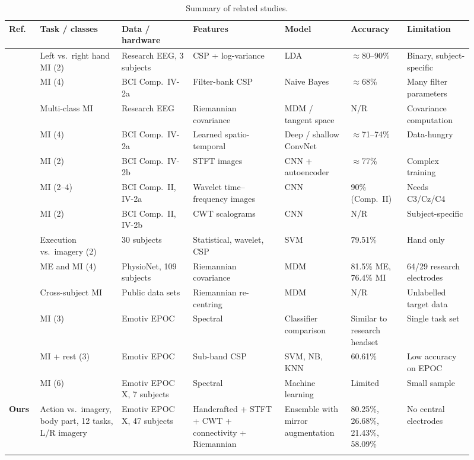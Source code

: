 \documentclass[pdflatex,sn-mathphys-num]{sn-jnl}%
\theoremstyle{thmstyleone}%
\theoremstyle{thmstyletwo}%
\theoremstyle{thmstylethree}%
\begin{document}
\begin{table}[t]
\centering
\caption{Summary of related studies.}
\label{tab:litreview}
\scriptsize
\setlength{\tabcolsep}{2.5pt}
\begin{tabular}{@{}L{0.06\linewidth}L{0.16\linewidth}L{0.14\linewidth}L{0.18\linewidth}L{0.13\linewidth}L{0.11\linewidth}L{0.13\linewidth}@{}}
\toprule
Ref. & Task / classes & Data / hardware & Features & Model & Accuracy & Limitation \\
\midrule
\cite{Ramoser2000} & Left vs.\ right hand MI (2) & Research EEG, 3 subjects & CSP + log-variance & LDA & $\approx$80--90\% & Binary, subject-specific \\
\cite{Ang2012} & MI (4) & BCI Comp.\ IV-2a & Filter-bank CSP & Naive Bayes & $\approx$68\% & Many filter parameters \\
\cite{Barachant2012} & Multi-class MI & Research EEG & Riemannian covariance & MDM / tangent space & N/R & Covariance computation \\
\cite{Schirrmeister2017} & MI (4) & BCI Comp.\ IV-2a & Learned spatio-temporal & Deep / shallow ConvNet & $\approx$71--74\% & Data-hungry \\
\cite{Tabar2017} & MI (2) & BCI Comp.\ IV-2b & STFT images & CNN + autoencoder & $\approx$77\% & Complex training \\
\cite{Xu2019} & MI (2--4) & BCI Comp.\ II, IV-2a & Wavelet time--frequency images & CNN & 90\% (Comp.\ II) & Needs C3/Cz/C4 \\
\cite{LeeChoi2019} & MI (2) & BCI Comp.\ II, IV-2b & CWT scalograms & CNN & N/R & Subject-specific \\
\cite{Wang2022} & Execution vs.\ imagery (2) & 30 subjects & Statistical, wavelet, CSP & SVM & 79.51\% & Hand only \\
\cite{Shuqfa2023} & ME and MI (4) & PhysioNet, 109 subjects & Riemannian covariance & MDM & 81.5\% ME, 76.4\% MI & 64/29 research electrodes \\
\cite{Zanini2018} & Cross-subject MI & Public data sets & Riemannian re-centring & MDM & N/R & Unlabelled target data \\
\cite{MartinezLeon2016} & MI (3) & Emotiv EPOC & Spectral & Classifier comparison & Similar to research headset & Single task set \\
\cite{Khan2019} & MI + rest (3) & Emotiv EPOC & Sub-band CSP & SVM, NB, KNN & 60.61\% & Low accuracy on EPOC \\
\cite{Tarara2025} & MI (6) & Emotiv EPOC X, 7 subjects & Spectral & Machine learning & Limited & Small sample \\
\textbf{Ours} & Action vs.\ imagery, body part, 12 tasks, L/R imagery & Emotiv EPOC X, 47 subjects & Handcrafted + STFT + CWT + connectivity + Riemannian & Ensemble with mirror augmentation & 80.25\%, 26.68\%, 21.43\%, 58.09\% & No central electrodes \\
\botrule
\end{tabular}
\end{table}
\end{document}
